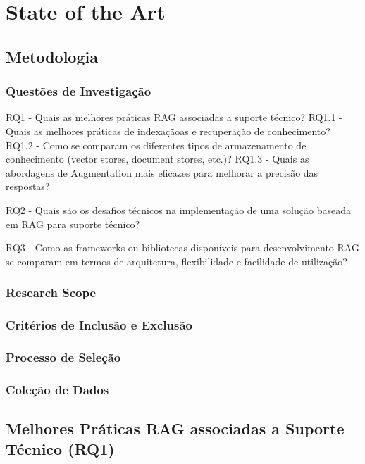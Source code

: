 
\chapter{State of the Art} %
\label{chap:Chapter3} 

\section{Metodologia}

\subsection{Questões de Investigação}

RQ1 - Quais as melhores práticas RAG associadas a suporte técnico? 
RQ1.1 - Quais as melhores práticas de indexaçãoas e recuperação de conhecimento?
RQ1.2 - Como se comparam os diferentes tipos de armazenamento de conhecimento (vector stores, document stores, etc.)?
RQ1.3 - Quais as abordagens de Augmentation mais eficazes para melhorar a precisão das respostas?

  
RQ2 - Quais são os desafios técnicos na implementação de uma solução baseada em RAG para suporte técnico?

RQ3 - Como as frameworks ou bibliotecas disponíveis para desenvolvimento RAG se comparam em termos de arquitetura, flexibilidade e facilidade de utilização?


\subsection{Research Scope}

\subsection{Critérios de Inclusão e Exclusão}


\subsection{Processo de Seleção}

\subsection{Coleção de Dados}


\section{Melhores Práticas RAG associadas a Suporte Técnico (RQ1)}


